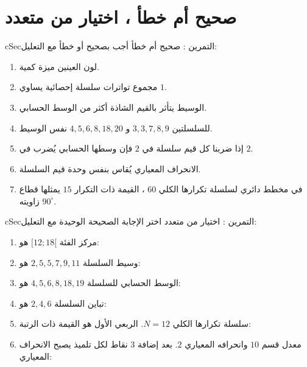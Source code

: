 \documentclass[12pt,a4paper]{article}
\newenvironment{BOX}[2]{\begin{otherlanguage}{english}\begin{arbox}{#1}{#2}}{\end{arbox}\end{otherlanguage}}
\newcounter{exo}
\newenvironment{tamrin}[1]{\stepcounter{exo}\begin{BOX}{cSec}{التمرين \theexo: #1}}{\end{BOX}}
\begin{document}
\section{صحيح أم خطأ ، اختيار من متعدد}
\begin{tamrin}{صحيح أم خطأ}
أجب بصحيح أو خطأ مع التعليل:
\begin{enumerate}
\item لون العينين ميزة كمية.
\item مجموع تواترات سلسلة إحصائية يساوي $1$.
\item الوسيط يتأثر بالقيم الشاذة أكثر من الوسط الحسابي.
\item للسلسلتين $3,3,7,8,9$ و $4,5,6,8,18,20$ نفس الوسيط.
\item إذا ضربنا كل قيم سلسلة في $2$ فإن وسطها الحسابي يُضرب في $2$.
\item الانحراف المعياري يُقاس بنفس وحدة قيم السلسلة.
\item في مخطط دائري لسلسلة تكرارها الكلي $60$ ، القيمة ذات التكرار $15$ يمثلها قطاع زاويته $90^\circ$.
\end{enumerate}
\end{tamrin}

\begin{tamrin}{اختيار من متعدد}
اختر الإجابة الصحيحة الوحيدة مع التعليل:
\begin{enumerate}
\item مركز الفئة $[12;18[$ هو:
\item وسيط السلسلة $2,5,5,7,9,11$ هو:
\item الوسط الحسابي للسلسلة $4,5,6,8,18,19$ هو:
\item تباين السلسلة $2,4,6$ هو:
\item سلسلة تكرارها الكلي $N=12$. الربعي الأول هو القيمة ذات الرتبة:
\item معدل قسم $10$ وانحرافه المعياري $2$. بعد إضافة $3$ نقاط لكل تلميذ يصبح الانحراف المعياري:
\end{enumerate}
\end{tamrin}
\end{document}
